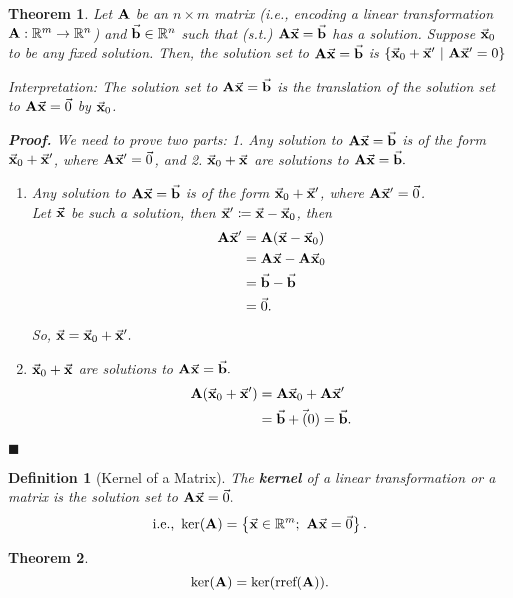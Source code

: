 \documentclass[12pt, a4paper]{article}
\newtheorem{thm}{Theorem}[subsection]
\newtheorem{df}{Definition}[subsection]
\newenvironment*{prf}{\par\indent\textbf{\textit{Proof. }}}{\hfill $\blacksquare$\par}
\def\R{{\mathbb{R}}}
\def\vecx{\va{x}}
\def\vecb{\va{b}}
\def\matrixA{\vb{A}}
\begin{document}
\begin{thm}
	Let $\matrixA$ be an $n\times m$ matrix (i.e., encoding a linear transformation $\matrixA: \R^m\to\R^n$) and $\vecb\in\R^n$ such that (\emph{s.t.}) $\matrixA\vecx=\vecb$ has a solution. Suppose $\vecx_0$ to be any fixed solution. Then, the solution set to $\matrixA\vecx=\vecb$ is $\left\{\vecx_0+\vecx'\ |\ \matrixA\vecx'=0\right\}$
	
	Interpretation: The solution set to $\matrixA\vecx=\vecb$ is the translation of the solution set to $\matrixA\vecx=\vec{0}$ by $\vecx_0$.
	\begin{prf}
	We need to prove two parts: 1. Any solution to $\matrixA\vecx=\vecb$ is of the form $\vecx_0+\vecx'$, where $\matrixA\vecx'=\vec{0}$, and 2. $\vecx_0+\vecx$ are solutions to $\matrixA\vecx=\vecb.$
		\begin{enumerate}
			\item Any solution to $\matrixA\vecx=\vecb$ is of the form $\vecx_0+\vecx'$, where $\matrixA\vecx'=\vec{0}$.\\
			Let $\vecx$ be such a solution, then $\vecx'\coloneqq\vecx-\vecx_0$, then $$\begin{aligned}\matrixA\vecx'&=\matrixA(\vecx-\vecx_0)\\&=\matrixA\vecx-\matrixA\vecx_0\\&=\vecb-\vecb\\&=\vec{0}.\end{aligned}$$
			So, $\vecx=\vecx_0+\vecx'.$
			\item $\vecx_0+\vecx$ are solutions to $\matrixA\vecx=\vecb.$
			$$\begin{aligned}
				\matrixA(\vecx_0+\vecx')&=\matrixA\vecx_0+\matrixA\vecx'\\
				&=\vecb+\vec(0)=\vecb.
			\end{aligned}$$

		\end{enumerate}
	\end{prf}
\end{thm}
\begin{df}[Kernel of a Matrix]
	The \textbf{kernel} of a linear transformation or a matrix is the solution set to $\matrixA\vecx=\vec{0}.$
	\[\text{i.e., }\ker(\matrixA)=\left\{\vecx\in\R^m;\  \matrixA\vecx=\vec{0}\right\}.\]
\end{df}
\begin{thm}
	\[\ker(\matrixA)=\ker(\text{rref}(\matrixA)).\]	
\end{thm}
\end{document}
